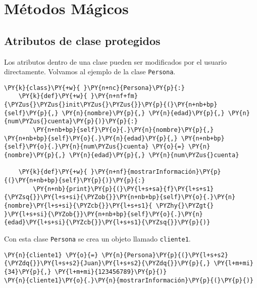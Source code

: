 \chapter{Métodos Mágicos} 

\section{Atributos de clase protegidos}

Los atributos dentro de una clase pueden ser modificados por el usuario
directamente. Volvamos al ejemplo de la clase \texttt{Persona}.

\begin{tcolorbox}[breakable, size=fbox, boxrule=1pt, pad at break*=1mm,colback=cellbackground, colframe=cellborder]
\begin{Verbatim}[commandchars=\\\{\}]
\PY{k}{class}\PY{+w}{ }\PY{n+nc}{Persona}\PY{p}{:}
    \PY{k}{def}\PY{+w}{ }\PY{n+nf+fm}{\PYZus{}\PYZus{}init\PYZus{}\PYZus{}}\PY{p}{(}\PY{n+nb+bp}{self}\PY{p}{,} \PY{n}{nombre}\PY{p}{,} \PY{n}{edad}\PY{p}{,} \PY{n}{num\PYZus{}cuenta}\PY{p}{)}\PY{p}{:}
        \PY{n+nb+bp}{self}\PY{o}{.}\PY{n}{nombre}\PY{p}{,} \PY{n+nb+bp}{self}\PY{o}{.}\PY{n}{edad}\PY{p}{,} \PY{n+nb+bp}{self}\PY{o}{.}\PY{n}{num\PYZus{}cuenta} \PY{o}{=} \PY{n}{nombre}\PY{p}{,} \PY{n}{edad}\PY{p}{,} \PY{n}{num\PYZus{}cuenta}

    \PY{k}{def}\PY{+w}{ }\PY{n+nf}{mostrarInformación}\PY{p}{(}\PY{n+nb+bp}{self}\PY{p}{)}\PY{p}{:}
        \PY{n+nb}{print}\PY{p}{(}\PY{l+s+sa}{f}\PY{l+s+s1}{\PYZsq{}}\PY{l+s+si}{\PYZob{}}\PY{n+nb+bp}{self}\PY{o}{.}\PY{n}{nombre}\PY{l+s+si}{\PYZcb{}}\PY{l+s+s1}{ \PYZhy{}\PYZgt{} }\PY{l+s+si}{\PYZob{}}\PY{n+nb+bp}{self}\PY{o}{.}\PY{n}{edad}\PY{l+s+si}{\PYZcb{}}\PY{l+s+s1}{\PYZsq{}}\PY{p}{)}
\end{Verbatim}
\end{tcolorbox}

Con esta clase \texttt{Persona} se crea un objeto llamado \texttt{cliente1}.

\begin{tcolorbox}[breakable, size=fbox, boxrule=1pt, pad at break*=1mm,colback=cellbackground, colframe=cellborder]
\begin{Verbatim}[commandchars=\\\{\}]
\PY{n}{cliente1} \PY{o}{=} \PY{n}{Persona}\PY{p}{(}\PY{l+s+s2}{\PYZdq{}}\PY{l+s+s2}{Juan}\PY{l+s+s2}{\PYZdq{}}\PY{p}{,} \PY{l+m+mi}{34}\PY{p}{,} \PY{l+m+mi}{123456789}\PY{p}{)}
\PY{n}{cliente1}\PY{o}{.}\PY{n}{mostrarInformación}\PY{p}{(}\PY{p}{)}
\end{Verbatim}
\end{tcolorbox}

